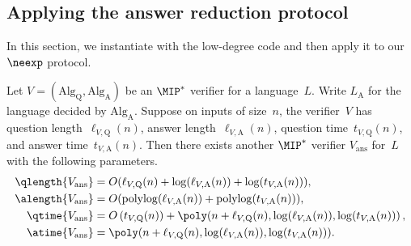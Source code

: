\subsection{Applying the answer reduction protocol}

In this section, we instantiate  with the low-degree code
and then apply it to our $\neexp$ protocol.

\begin{theorem}\label{thm:applied-with-low-degree-code}
Let $V = (\mathrm{Alg}_{\mathrm{Q}}, \mathrm{Alg}_{\mathrm{A}})$ be an $\MIP^*$ verifier for a language~$L$.
		Write $L_{\mathrm{A}}$ for the language decided by $\mathrm{Alg}_{\mathrm{A}}$.
		Suppose on inputs of size~$n$, the verifier~$V$ has question length~$\ell_{V,\mathrm{Q}}(n)$, answer length~$\ell_{V,\mathrm{A}}(n)$,
		question time~$t_{V,\mathrm{Q}}(n)$, and answer time~$t_{V,\mathrm{A}}(n)$.
		Then there exists another $\MIP^*$ verifier $V_{\mathrm{ans}}$ for~$L$ with the following parameters.
\begin{align*}
\qlength{V_{\mathrm{ans}}} &= O(\ell_{V, \mathrm{Q}}(n) + \log(\ell_{V,\mathrm{A}}(n))+ \log(t_{V, \mathrm{A}}(n))),\\
\alength{V_{\mathrm{ans}}} &= O(\mathrm{poly log}(\ell_{V, \mathrm{A}}(n)) + \mathrm{poly log}(t_{V, \mathrm{A}}(n))),\\
\qtime{V_{\mathrm{ans}}} &= O\left(t_{V,\mathrm{Q}}(n)) + \poly(n + \ell_{V, \mathrm{Q}}(n), \log(\ell_{V, \mathrm{A}}(n)), \log(t_{V, \mathrm{A}}(n))\right),\\
\atime{V_{\mathrm{ans}}} &= \poly(n + \ell_{V, \mathrm{Q}}(n), \log(\ell_{V, \mathrm{A}}(n)), \log(t_{V, \mathrm{A}}(n))).
\end{align*}
\end{theorem}
